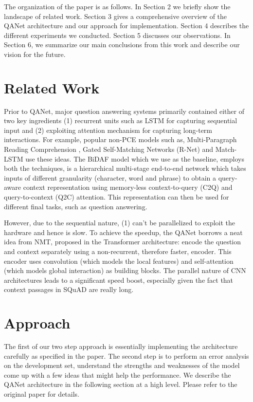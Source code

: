 \documentclass{article}
\begin{document}
The organization of the paper is as follows. In Section 2 we briefly show the landscape of related work. Section 3 gives a comprehensive overview of the QANet architecture and our approach for implementation. Section 4 describes the different experiments we conducted. Section 5 discusses our observations. In Section 6, we summarize our main conclusions from this work and describe our vision for the future.

\section{Related Work}
\small
Prior to QANet, major question answering systems primarily contained either of two key ingredients (1) recurrent units such as LSTM for capturing sequential input and (2) exploiting attention mechanism for capturing long-term interactions. For example, popular non-PCE models such as, Multi-Paragraph Reading Comprehension \cite{clark2017simple}, Gated Self-Matching Networks (R-Net) \cite{wang2017gated} and Match-LSTM \cite{wang2016machine} use these ideas. The BiDAF \cite{seo2016bidirectional} model which we use as the baseline, employs both the techniques, is a hierarchical multi-stage end-to-end network which takes inputs of different granularity (character, word and  phrase) to obtain a query-aware context representation using memory-less context-to-query (C2Q) and query-to-context (Q2C) attention. This representation can then be used for different final tasks, such as question answering. 

However, due to the sequential nature, (1) can’t be parallelized to exploit the hardware and hence is slow. To achieve the speedup, the QANet borrows a neat idea from NMT, proposed in the Transformer\cite{vaswani2017attention} architecture: encode the question and context separately using a non-recurrent, therefore faster, encoder. This encoder uses convolution (which models the local features) and self-attention (which models global interaction) as building blocks. The parallel nature of CNN architectures leads to a significant speed boost, especially given the fact that context passages in SQuAD are really long.

\section{Approach}
\small
The first of our two step approach is essentially implementing the architecture carefully as specified in the paper. The second step is to perform an error analysis on the development set, understand the strengths and weaknesses of the model come up with a few ideas that might help the performance. We describe the QANet architecture in the following section at a high level. Please refer to the original paper \cite{yu2018qanet} for details. 
\end{document}
